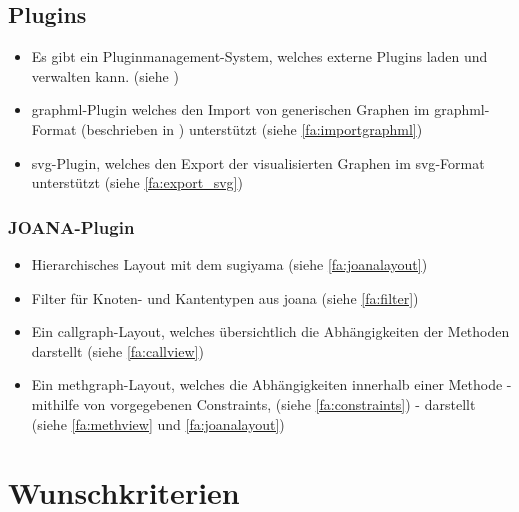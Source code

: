 \subsection{Plugins}
  \begin{itemize}
    \item Es gibt ein Pluginmanagement-System, welches externe Plugins laden und verwalten kann. (siehe )
    \item \gls{graphml}-Plugin welches den Import von generischen Graphen im \gls{graphml}-Format (beschrieben in ) unterstützt (siehe \ref{fa:importgraphml})
    \item \gls{svg}-Plugin, welches den Export der visualisierten Graphen im \gls{svg}-Format unterstützt (siehe \ref{fa:export_svg})
  \end{itemize}
  
  \subsubsection{JOANA-Plugin}
    \begin{itemize}
      \item Hierarchisches Layout mit dem \gls{sugiyama} (siehe \ref{fa:joanalayout})
      \item Filter für Knoten- und Kantentypen aus \gls{joana} (siehe \ref{fa:filter})
      \item Ein \gls{callgraph}-Layout, welches übersichtlich die Abhängigkeiten der Methoden darstellt (siehe \ref{fa:callview})
      \item Ein \gls{methgraph}-Layout, welches die Abhängigkeiten innerhalb einer Methode - mithilfe von vorgegebenen Constraints, (siehe \ref{fa:constraints}) - darstellt (siehe \ref{fa:methview} und \ref{fa:joanalayout})
    \end{itemize}
  

\section{Wunschkriterien}

